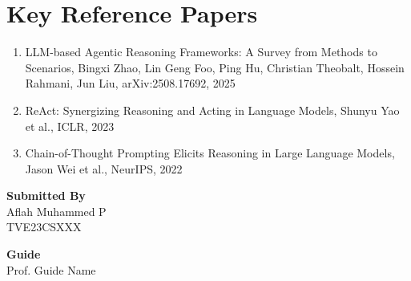 \documentclass[12pt]{article}
\newcommand{\studentname}{Aflah Muhammed P}
\newcommand{\rollno}{TVE23CSXXX}
\newcommand{\guidename}{Prof. Guide Name}
\begin{document}
\section*{Key Reference Papers}
\begin{enumerate}
  \item LLM-based Agentic Reasoning Frameworks: A Survey from Methods to Scenarios, Bingxi Zhao, Lin Geng Foo, Ping Hu, Christian Theobalt, Hossein Rahmani, Jun Liu, arXiv:2508.17692, 2025
  \item ReAct: Synergizing Reasoning and Acting in Language Models, Shunyu Yao et al., ICLR, 2023
  \item Chain-of-Thought Prompting Elicits Reasoning in Large Language Models, Jason Wei et al., NeurIPS, 2022
\end{enumerate}
\vspace{1.5em}

\noindent\textbf{Submitted By}\\
\studentname\\
\rollno

\vspace{1em}
\noindent\textbf{Guide}\\
\guidename
\end{document}
